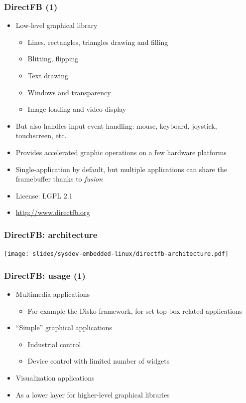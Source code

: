 \begin{frame}
  \frametitle{DirectFB (1)}
  \begin{itemize}
  \item Low-level graphical library
    \begin{itemize}
    \item Lines, rectangles, triangles drawing and filling
    \item Blitting, flipping
    \item Text drawing
    \item Windows and transparency
    \item Image loading and video display
    \end{itemize}
  \item But also handles input event handling: mouse, keyboard, joystick,
    touchscreen, etc.
  \item Provides accelerated graphic operations on a few hardware
    platforms
  \item Single-application by default, but multiple applications can
    share the framebuffer thanks to {\em fusion}
  \item License: LGPL 2.1
  \item \url{http://www.directfb.org}
  \end{itemize}
\end{frame}

\begin{frame}
  \frametitle{DirectFB: architecture}
  \begin{center}
    \texttt{[image: slides/sysdev-embedded-linux/directfb-architecture.pdf]}
  \end{center}
\end{frame}

\begin{frame}
  \frametitle{DirectFB: usage (1)}
  \begin{itemize}
  \item Multimedia applications
    \begin{itemize}
    \item For example the Disko framework, for set-top box related
      applications
    \end{itemize}
  \item ``Simple'' graphical applications
    \begin{itemize}
    \item Industrial control
    \item Device control with limited number of widgets
    \end{itemize}
  \item Visualization applications
  \item As a lower layer for higher-level graphical libraries
  \end{itemize}
\end{frame}

